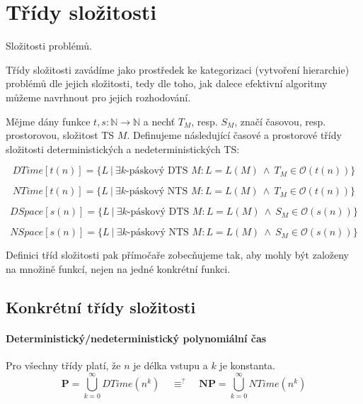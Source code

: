 
\section{Třídy složitosti}

\begin{compactitem}
    \item Složitosti problémů.

    \item Třídy složitosti zavádíme jako prostředek ke kategorizaci (vytvoření hierarchie) problémů dle jejich složitosti, tedy dle toho, jak dalece efektivní algoritmy můžeme navrhnout pro jejich rozhodování.

    \item Mějme dány funkce $t, s : \mathbb{N} \rightarrow \mathbb{N}$ a nechť $T_M$, resp. $S_M$, značí časovou, resp. prostorovou, složitost TS $M$. Definujeme následující časové a prostorové třídy složitosti deterministických a nedeterministických TS:

    $$DTime[ t(n) ] = \{ L ~|~ \exists k \text{-páskový DTS } M : L = L(M) ~\land~ T_M \in \mathcal{O}(t(n)) \}$$

    $$NTime[ t(n) ] = \{ L ~|~ \exists k \text{-páskový NTS } M : L = L(M) ~\land~ T_M \in \mathcal{O}(t(n)) \}$$

    $$DSpace[ s(n) ] = \{ L ~|~ \exists k \text{-páskový DTS } M : L = L(M) ~\land~ S_M \in \mathcal{O}(s(n)) \}$$

    $$NSpace[ s(n) ] = \{ L ~|~ \exists k \text{-páskový NTS } M : L = L(M) ~\land~ S_M \in \mathcal{O}(s(n)) \}$$

    \item Definici tříd složitosti pak přímočaře zobecňujeme tak, aby mohly být založeny na množině funkcí, nejen na jedné konkrétní funkci.
\end{compactitem}

\subsection{Konkrétní třídy složitosti}

\paragraph*{Deterministický/nedeterministický polynomiální čas} Pro všechny třídy platí, že $n$ je délka vstupu a $k$ je konstanta. $$ \mathbf{P} = \bigcup_{k=0}^{\infty} DTime(n^k) ~~~~~ \equiv^? ~~~~~ \mathbf{NP} = \bigcup_{k=0}^{\infty} NTime(n^k) $$

